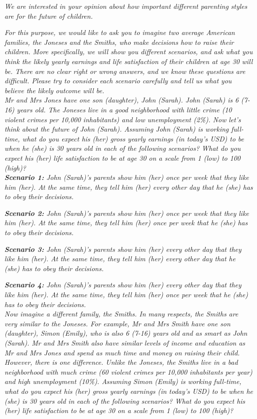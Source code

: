 \documentclass[12pt, a4paper, english]{article}
\begin{document}
\textit{We are interested in your opinion about how important different parenting styles are for the future of children.}

\textit{For this purpose, we would like to ask you to imagine two average American families, the Joneses and the Smiths, who make decisions how to raise their children. More specifically, we will show you different scenarios, and ask what you think the likely yearly earnings and life satisfaction of their children at age 30 will be. There are no clear right or wrong answers, and we know these questions are difficult. Please try to consider each scenario carefully and tell us what you believe the likely outcome will be.}\\

\textit{Mr and Mrs Jones have one son (daughter), John (Sarah). John (Sarah) is 6 (7-16) years old. The Joneses live in a good neighborhood with little crime (10 violent crimes per 10,000 inhabitants) and low unemployment (2\%). Now let's think about the future of John (Sarah). Assuming John (Sarah) is working full-time, what do you expect his (her) gross yearly earnings (in today's USD) to be when he (she) is 30 years old in each of the following scenarios? What do you expect his (her) life satisfaction to be at age 30 on a scale from 1 (low) to 100 (high)?}\\

\textit{\textbf{Scenario 1:} John (Sarah)'s parents show him (her) once per week that they like him (her). At the same time, they tell him (her) every other day that he (she) has to obey their decisions.}

\textit{\textbf{Scenario 2:} John (Sarah)'s parents show him (her) once per week that they like him (her). At the same time, they tell him (her) once per week that he (she) has to obey their decisions.}

\textit{\textbf{Scenario 3:} John (Sarah)'s parents show him (her) every other day that they like him (her). At the same time, they tell him (her) every other day that he (she) has to obey their decisions.}

\textit{\textbf{Scenario 4:} John (Sarah)'s parents show him (her) every other day that they like him (her). At the same time, they tell him (her) once per week that he (she) has to obey their decisions.}\\

\textit{Now imagine a different family, the Smiths. In many respects, the Smiths are very similar to the Joneses. For example, Mr and Mrs Smith have one son (daughter), Simon (Emily), who is also 6 (7-16) years old and as smart as John (Sarah). Mr and Mrs Smith also have similar levels of income and education as Mr and Mrs Jones and spend as much time and money on raising their child. However, there is one difference. Unlike the Joneses, the Smiths live in a bad neighborhood with much crime (60 violent crimes per 10,000 inhabitants per year) and high unemployment (10\%). Assuming Simon (Emily) is working full-time, what do you expect his (her) gross yearly earnings (in today's USD) to be when he (she) is 30 years old in each of the following scenarios? What do you expect his (her) life satisfaction to be at age 30 on a scale from 1 (low) to 100 (high)?}\\
\end{document}
